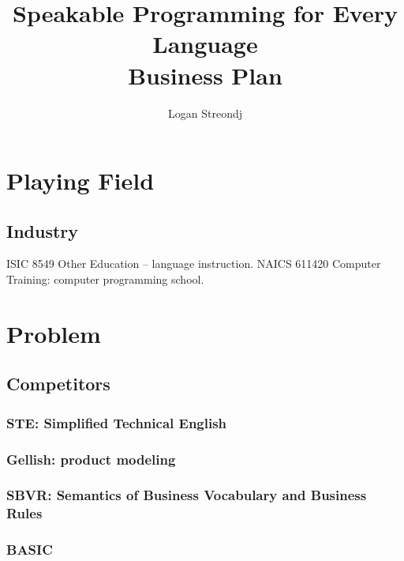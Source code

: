 \documentclass{article}
\title{Speakable Programming for Every Language\\
Business Plan}
\author{Logan Streondj}
\begin{document}
\maketitle
\tableofcontents
%


\section{Playing Field}
\subsection{Industry}
ISIC 8549 Other Education -- language instruction.
NAICS 611420 Computer Training: computer programming school.

\section{Problem}
\subsection{Competitors}
\subsubsection{STE: Simplified Technical English}
\subsubsection{Gellish: product modeling}
\subsubsection{SBVR: Semantics of Business Vocabulary and
Business Rules}

\subsubsection{BASIC}
\end{document}
